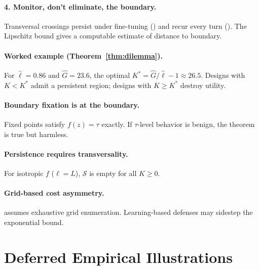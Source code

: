 \documentclass[11pt]{article}
\begin{document}
\paragraph{4. Monitor, don't eliminate, the boundary.}
Transversal crossings persist under fine-tuning ()
and recur every turn (). The Lipschitz bound gives a
computable estimate of distance to boundary.

\paragraph{Worked example (Theorem~\ref{thm:dilemma}).}
For $\hat\ell = 0.86$ and $\hat G = 23.6$, the optimal $K^* = \hat G / \hat\ell - 1 \approx 26.5$. Designs with $K < K^*$ admit a persistent region; designs with $K \geq K^*$ destroy utility.

\paragraph{Boundary fixation is at the boundary.}
Fixed points satisfy $f(z) = \tau$ exactly. If $\tau$-level behavior
is benign, the theorem is true but harmless.

\paragraph{Persistence requires transversality.}
For isotropic $f$ ($\ell = L$), $\mathcal{S}$ is empty for all $K \geq 0$.

\paragraph{Grid-based cost asymmetry.}
 assumes exhaustive grid enumeration. Learning-based
defenses may sidestep the exponential bound.

\section{Deferred Empirical Illustrations}
\label{app:deferred-empirical}

\begin{table}[h]
\centering
\small
\caption{Continuous-defense validator across three OpenAI target
models. $\mathrm{FP}_{\mathrm{int}} = 0$ holds across all three.}
\label{tab:three-target}

\end{table}

\begin{table}[h]
\centering
\small
\caption{Llama-Guard-3-1B applied to the $82$
unsafe-seed prompts, demonstrating
's injective-incomplete horn. 52 of 82 attacks pass as \texttt{safe}.}
\label{tab:llamaguard-demo}

\end{table}
\end{document}
